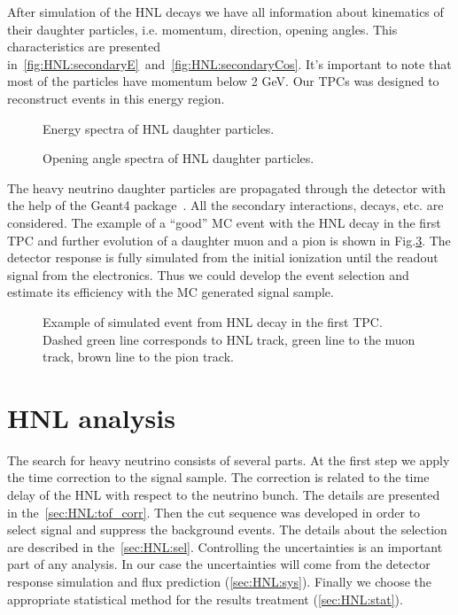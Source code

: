 \documentclass[../main.tex]{subfiles}
\begin{document}
After simulation of the HNL decays we have all information about kinematics of their daughter particles, i.e. momentum, direction, opening angles. This characteristics are presented in~\autoref{fig:HNL:secondaryE}~and~\autoref{fig:HNL:secondaryCos}. It's important to note that most of the particles have momentum below 2 GeV. Our TPCs was designed to reconstruct events in this energy region.
\begin{figure}[!ht]
\begin{center}
    \caption{Energy spectra of HNL daughter particles.}
    \label{fig:HNL:secondaryE}
\end{center}
\end{figure}
\begin{figure}[!ht]
\begin{center}
    \caption{Opening angle spectra of HNL daughter particles.}
    \label{fig:HNL:secondaryCos}
\end{center}
\end{figure}
The heavy neutrino daughter particles are propagated through the detector with the help of the Geant4 package~\cite{Agostinelli2003}. All the secondary interactions, decays, etc. are considered.
The example of a ``good'' MC event with the HNL decay in the first TPC and further evolution of a daughter muon and a pion is shown in Fig.\ref{fig:HNL:event}. The detector response is fully simulated from the initial ionization until the readout signal from the electronics. Thus we could develop the event selection and estimate its efficiency with the MC generated signal sample.
\begin{figure}[!ht]
    \caption{Example of simulated event from HNL decay in the first TPC. Dashed green line corresponds to HNL track, green line to the muon track, brown line to the pion track.}
    \label{fig:HNL:event}
\end{figure}

\chapter{HNL analysis}
\label{ch:HNL:ana}
The search for heavy neutrino consists of several parts. At the first step we apply the time correction to the signal sample. The correction is related to the time delay of the HNL with respect to the neutrino bunch. The details are presented in the~\autoref{sec:HNL:tof_corr}. Then the cut sequence was developed in order to select signal and suppress the background events. The details about the selection are described in the~\autoref{sec:HNL:sel}. Controlling the uncertainties is an important part of any analysis. In our case the uncertainties will come from the detector response simulation and flux prediction (\autoref{sec:HNL:sys}). Finally we choose the appropriate statistical method for the results treatment (\autoref{sec:HNL:stat}).
\end{document}
